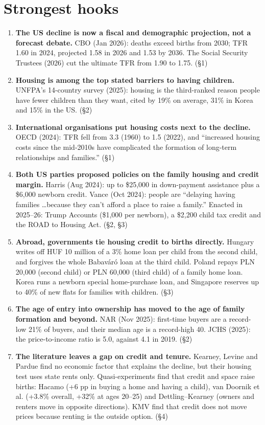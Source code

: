\documentclass[10pt]{article}
\begin{document}
\section*{Strongest hooks}
\begin{enumerate}[leftmargin=1.6em]
  \item \textbf{The US decline is now a fiscal and demographic projection, not a forecast debate.} CBO (Jan 2026): deaths exceed births from 2030; TFR 1.60 in 2024, projected 1.58 in 2026 and 1.53 by 2036. The Social Security Trustees (2026) cut the ultimate TFR from 1.90 to 1.75. (\S1)
  \item \textbf{Housing is among the top stated barriers to having children.} UNFPA's 14-country survey (2025): housing is the third-ranked reason people have fewer children than they want, cited by 19\% on average, 31\% in Korea and 15\% in the US. (\S2)
  \item \textbf{International organisations put housing costs next to the decline.} OECD (2024): TFR fell from 3.3 (1960) to 1.5 (2022), and ``increased housing costs since the mid-2010s have complicated the formation of long-term relationships and families.'' (\S1)
  \item \textbf{Both US parties proposed policies on the family housing and credit margin.} Harris (Aug 2024): up to \$25,000 in down-payment assistance plus a \$6,000 newborn credit. Vance (Oct 2024): people are ``delaying having families \ldots because they can't afford a place to raise a family.'' Enacted in 2025--26: Trump Accounts (\$1,000 per newborn), a \$2,200 child tax credit and the ROAD to Housing Act. (\S2, \S3)
  \item \textbf{Abroad, governments tie housing credit to births directly.} Hungary writes off HUF 10 million of a 3\% home loan per child from the second child, and forgives the whole Babaváró loan at the third child. Poland repays PLN 20,000 (second child) or PLN 60,000 (third child) of a family home loan. Korea runs a newborn special home-purchase loan, and Singapore reserves up to 40\% of new flats for families with children. (\S3)
  \item \textbf{The age of entry into ownership has moved to the age of family formation and beyond.} NAR (Nov 2025): first-time buyers are a record-low 21\% of buyers, and their median age is a record-high 40. JCHS (2025): the price-to-income ratio is 5.0, against 4.1 in 2019. (\S2)
  \item \textbf{The literature leaves a gap on credit and tenure.} Kearney, Levine and Pardue find no economic factor that explains the decline, but their housing test uses state rents only. Quasi-experiments find that credit and space raise births: Hacamo (+6 pp in buying a home and having a child), van Doornik et al. (+3.8\% overall, +32\% at ages 20--25) and Dettling--Kearney (owners and renters move in opposite directions). KMV find that credit does not move prices because renting is the outside option. (\S4)
\end{enumerate}
\end{document}

